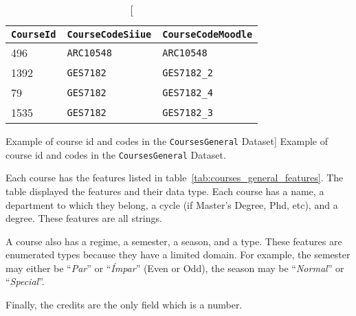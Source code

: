 \begin{table}[h!]
    \centering

    \begin{tabular}{l l l}
\texttt{CourseId} & \texttt{CourseCodeSiiue} & \texttt{CourseCodeMoodle} \\ \hline
        496       & \texttt{ARC10548}        & \texttt{ARC10548}         \\
        1392      & \texttt{GES7182}         & \texttt{GES7182\_2}       \\
        79        & \texttt{GES7182}         & \texttt{GES7182\_4}       \\
        1535      & \texttt{GES7182}         & \texttt{GES7182\_3}       \\
    \end{tabular}

    \caption
        [Example of course id and codes in the \texttt{CoursesGeneral} Dataset]
        {Example of course id and codes in the \texttt{CoursesGeneral} Dataset.}

    \label{tab:course_code_example}
\end{table}

Each course has the features listed in
table~\ref{tab:courses_general_features}. The table displayed the features and
their data type. Each course has a name, a department to which they belong, a
cycle (if Master's Degree, Phd, etc), and a degree. These features are all
strings.

A course also has a regime, a semester, a season, and a type. These features
are enumerated types because they have a limited domain. For example, the
semester may either be ``\textit{Par}'' or ``\textit{Ímpar}'' (Even or Odd),
the season may be ``\textit{Normal}'' or ``\textit{Special}''.

Finally, the credits are the only field which is a number.

